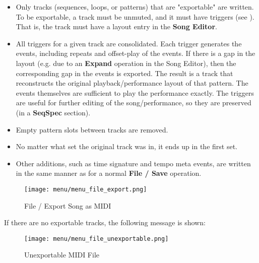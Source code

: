    \begin{itemize}
      \item Only tracks (sequences, loops, or patterns)
         that are "exportable" are written.  To be exportable, a
         track must be unmuted, and it must have triggers (see
         ).  That is,
         the track must have a layout entry in the \textbf{Song Editor}.
      \item All triggers for a given track are consolidated.
         Each trigger generates the events, including repeats and
         offset-play of the events.
         If there is a gap in the layout
         (e.g. due to an \textbf{Expand} operation in the Song Editor),
         then the corresponding gap in the events is exported.
         The result is a track that reconstructs the original
         playback/performance layout of that pattern.
         The events themselves are sufficient to play the performance exactly.
         The triggers are useful for further editing of the song/performance,
         so they are preserved (in a \textbf{SeqSpec} section).
      \item Empty pattern slots between tracks are removed.
      \item No matter what set the original track was in, it ends up in the
         first set.
      \item Other additions, such as time signature and tempo meta events, are
         written in the same manner as for a normal \textbf{File / Save}
         operation.
   \end{itemize}

\begin{figure}[H]
   \centering 
   \texttt{[image: menu/menu\_file\_export.png]}
   \caption{File / Export Song as MIDI}
   \label{fig:seq64_midi_export_file_export}
\end{figure}

   If there are no exportable tracks, the following message is shown:

\begin{figure}[H]
   \centering 
   \texttt{[image: menu/menu\_file\_unexportable.png]}
   \caption{Unexportable MIDI File}
   \label{fig:seq64_midi_export_file_unexportable}
\end{figure}


